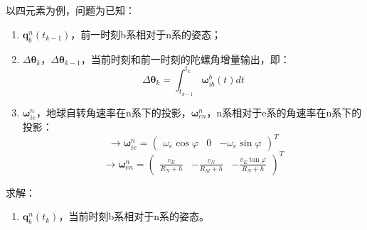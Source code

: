 \documentclass[12pt, twocolumn]{article}
\newcommand{\normf}{\kaishu}
\begin{document}
	\section{\normf{姿态更新}}
	以四元素为例，问题为已知：
	\begin{enumerate}
		\item $\boldsymbol{q}_b^n(t_{k-1})$，前一时刻b系相对于n系的姿态；
		\item $\Delta \boldsymbol{\theta}_k$，$\Delta \boldsymbol{\theta}_{k-1}$，当前时刻和前一时刻的陀螺角增量输出，即：
		\begin{equation*}
			\Delta \boldsymbol{\theta}_k=\int_{t_{k-1}}^{t_k}\boldsymbol{\omega}_{ib}^b(t)dt
		\end{equation*}
		\item $\boldsymbol{\omega}_{ie}^n$，地球自转角速率在n系下的投影，$\boldsymbol{\omega}_{en}^n$，n系相对于e系的角速率在n系下的投影：
		\begin{equation*}
			\to\boldsymbol{\omega}_{ie}^n=\begin{pmatrix}
				 \omega_e\cos\varphi&0&-\omega_e\sin\varphi
			\end{pmatrix}^T
		\end{equation*}
		\begin{equation*}
			\to\boldsymbol{\omega}_{en}^n=\begin{pmatrix}
				 \frac{v_E}{R_N+h}&-\frac{v_N}{R_M+h}&-\frac{v_E\tan\varphi}{R_N+h}
			\end{pmatrix}^T
		\end{equation*}
	\end{enumerate}
	求解：
	\begin{enumerate}
		\item $\boldsymbol{q}_b^n(t_k)$，当前时刻b系相对于n系的姿态。
	\end{enumerate}
\end{document}
